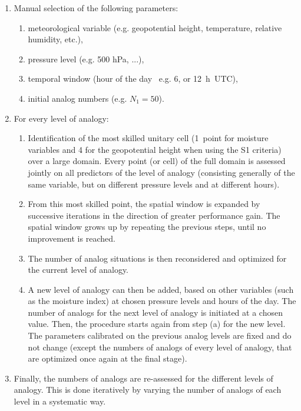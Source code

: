 \documentclass[hess, manuscript]{copernicus}
\begin{document}
\begin{enumerate}
	\item Manual selection of the following parameters:
	\begin{enumerate}
		\item meteorological variable (e.g. geopotential height, temperature, relative humidity, etc.),
		\item pressure level (e.g. 500 hPa, ...),
		\item temporal window (hour of the day \textendash\ e.g. 6, or 12~h~UTC),
		\item initial analog numbers (e.g. $N_{1}=50$).
	\end{enumerate}
	
	\item For every level of analogy:
	\begin{enumerate}
		\item Identification of the most skilled unitary cell (1~point for moisture variables and 4 for the geopotential height when using the S1 criteria) over a large domain. Every point (or cell) of the full domain is assessed jointly on all predictors of the level of analogy (consisting generally of the same variable, but on different pressure levels and at different hours).
		\item From this most skilled point, the spatial window is expanded by successive iterations in the direction of greater performance gain. The spatial window grows up by repeating the previous steps, until no improvement is reached.
		\item The number of analog situations is then reconsidered and optimized for the current level of analogy.
		\item A new level of analogy can then be added, based on other variables (such as the moisture index) at chosen pressure levels and hours of the day. The number of analogs for the next level of analogy is initiated at a chosen value. Then, the procedure starts again from step (a) for the new level. The parameters calibrated on the previous analog levels are fixed and do not change (except the numbers of analogs of every level of analogy, that are optimized once again at the final stage). 
	\end{enumerate}
	\item Finally, the numbers of analogs are re-assessed for the different levels of analogy. This is done iteratively by varying the number of analogs of each level in a systematic way.
\end{enumerate}
\end{document}
